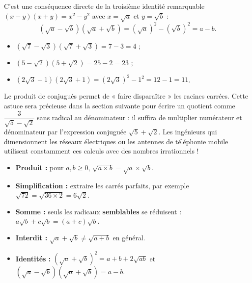 \documentclass[11pt]{article}
\begin{document}
C'est une conséquence directe de la troisième identité remarquable $(x-y)(x+y) = x^2 - y^2$ avec $x = \sqrt{a}$ et $y = \sqrt{b}$ :
\[ \left(\sqrt{a} - \sqrt{b}\right)\left(\sqrt{a} + \sqrt{b}\right) = \left(\sqrt{a}\right)^2 - \left(\sqrt{b}\right)^2 = a - b. \]

\begin{exemplebox}
\begin{itemize}
\item $\left(\sqrt{7} - \sqrt{3}\right)\left(\sqrt{7} + \sqrt{3}\right) = 7 - 3 = 4$ ;
\item $\left(5 - \sqrt{2}\right)\left(5 + \sqrt{2}\right) = 25 - 2 = 23$ ;
\item $\left(2\sqrt{3} - 1\right)\left(2\sqrt{3} + 1\right) = \left(2\sqrt{3}\right)^2 - 1^2 = 12 - 1 = 11$.
\end{itemize}
\end{exemplebox}

\begin{savaistu}
Le produit de conjugués permet de « faire disparaître » les racines carrées. Cette astuce sera précieuse dans la section suivante pour écrire un quotient comme $\dfrac{3}{\sqrt{5} - \sqrt{2}}$ sans radical au dénominateur : il suffira de multiplier numérateur et dénominateur par l'expression conjuguée $\sqrt{5} + \sqrt{2}$. Les ingénieurs qui dimensionnent les réseaux électriques ou les antennes de téléphonie mobile utilisent constamment ces calculs avec des nombres irrationnels !
\end{savaistu}

\begin{aretenir}
\begin{itemize}
\item \textbf{Produit :} pour $a, b \geq 0$, $\sqrt{a \times b} = \sqrt{a} \times \sqrt{b}$.
\item \textbf{Simplification :} extraire les carrés parfaits, par exemple $\sqrt{72} = \sqrt{36 \times 2} = 6\sqrt{2}$.
\item \textbf{Somme :} seuls les radicaux \textbf{semblables} se réduisent : $a\sqrt{b} + c\sqrt{b} = (a+c)\sqrt{b}$.
\item \textbf{Interdit :} $\sqrt{a} + \sqrt{b} \neq \sqrt{a+b}$ en général.
\item \textbf{Identités :} $(\sqrt{a} + \sqrt{b})^2 = a + b + 2\sqrt{ab}$ et $\left(\sqrt{a} - \sqrt{b}\right)\left(\sqrt{a} + \sqrt{b}\right) = a - b$.
\end{itemize}
\end{aretenir}
\end{document}
